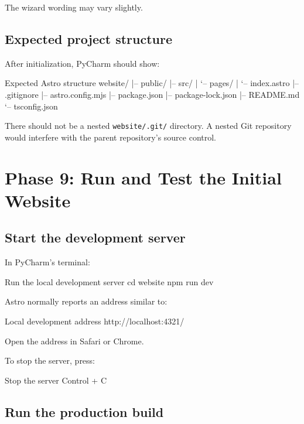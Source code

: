 \documentclass[11pt,letterpaper]{article}
\newcommand{\filepath}[1]{\texttt{#1}}
\begin{document}
The wizard wording may vary slightly.

\subsection{Expected project structure}

After initialization, PyCharm should show:

\begin{codebox}{Expected Astro structure}
website/
|-- public/
|-- src/
|   `-- pages/
|       `-- index.astro
|-- .gitignore
|-- astro.config.mjs
|-- package.json
|-- package-lock.json
|-- README.md
`-- tsconfig.json
\end{codebox}

\begin{warningbox}
There should not be a nested \filepath{website/.git/} directory.
A nested Git repository would interfere with the parent repository's
source control.
\end{warningbox}

\section{Phase 9: Run and Test the Initial Website}

\subsection{Start the development server}

In PyCharm's terminal:

\begin{commandbox}{Run the local development server}
cd website
npm run dev
\end{commandbox}

Astro normally reports an address similar to:

\begin{codebox}{Local development address}
http://localhost:4321/
\end{codebox}

Open the address in Safari or Chrome.

To stop the server, press:

\begin{codebox}{Stop the server}
Control + C
\end{codebox}

\subsection{Run the production build}
\end{document}
